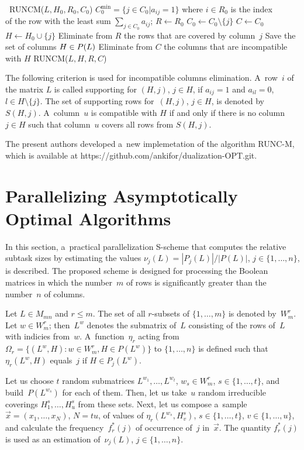 \begin{multicols}{2}
\begin{AlgProcedure}{\ RUNCM($L,H_0,R_0,C_0$)}
    \STATE $C_0^{\min}=\{j\in C_0 | a_{ij}=1\}$ where $i\in R_0$ is the index \\of the row
    with the least sum $\sum_{j\in C_0} a_{ij}$;
    \STATE $R   \leftarrow R_0$
    \STATE $C_0 \leftarrow C_0 \setminus \{j\}$
    \STATE $C   \leftarrow C_0$
    \STATE $H   \leftarrow H_0 \cup \{j\}$
    \STATE Eliminate from $R$ the rows that are covered by column~$j$
    \STATE Save the set of columns $H\in P(L)$
    \ELSE
    \STATE Eliminate from $C$ the columns that are incompatible with $H$
    \STATE \CALL RUNCM($L,H,R,C$)
    \ENDIF
    \ENDFOR
\end{AlgProcedure}


The following criterion is used for incompatible columns
elimination. A~row~$i$ of the matrix $L$ is called
{supporting} for $(H, j)$, $j \in H$, if $a_{ij}=1$ and
$a_{il} = 0$, $l \in H \setminus \{j\}$. The set of supporting
rows for~$(H, j)$, $j \in H$, is denoted by~$S(H,j)$. A~column~$u$
is compatible with $H$ if and only if  there is no column  $j \in
H$ such that column~$u$ covers all rows from $S(H,j)$.

The present authors developed a~new implemetation of the algorithm RUNC-M, which is
available at
{\sf https://github.com/ankifor/dualization-OPT.git}.


\section{Parallelizing Asymptotically Optimal Algorithms}

\noindent
In this section, a~practical parallelization S-scheme
that computes the relative subtask sizes by estimating the values
$\nu_j(L)=|P_j(L)|/|P(L)|$, $j\in \{1, \ldots, n\}$, is  described.
The proposed scheme is designed for processing the Boolean
matrices in which the number~$m$ of rows is significantly greater
than the number~$n$ of columns.

Let $L\in M_{mn}$ and $r\leq m$.
The set of all \mbox{$r$-subsets} of $\{1, \ldots, m\}$ is denoted by~$W_m^r$.
Let $w \in W_m^r$; then~$L^w$ denotes the submatrix of~$L$
consisting of the rows of~$L$ with indicies from~$w$.
A~function~$\eta_r$ acting from 
$\Omega_r = \{ (L^w,H) : w\in W_m^r, H\in
P(L^w)\}$ to $\{1, \ldots, n\}$ is defined such that 
$\eta_r(L^w, H)$ equals~$j$ if $H\in P_j(L^w)$.

Let us choose $t$ random submatrices $L^{w_1}, \ldots, L^{w_t}$, 
$w_s \in W_m^r$, $s \in \{1, \ldots, t\}$, 
and build~$P(L^{w_s})$ for each of them.
Then, let us take~$u$ random irreducible coverings $H_1^s, \ldots, H_u^s$ from these sets.
Next, let us compose a~sample $\vec{x}=(x_1,\ldots,x_N)$, $N = t u$, of values of
$\eta_r(L^{w_s}, H_v^s)$, $s\in\{1, \ldots, t\}$, $v \in \{1, \ldots, u\}$,
and calculate the frequency~$f^*_r(j)$ of occurrence of~$j$ in~$\vec x$.
The quantity $f^*_r(j)$ is used as an estimation of~$\nu_j(L)$,
$j\in \{1, \ldots, n\}$.


\end{multicols}
